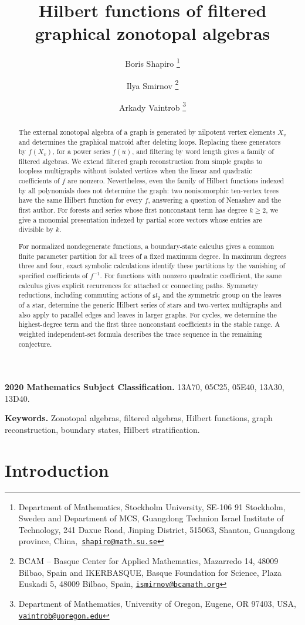 \documentclass[reqno]{article}
\title{\bf Hilbert functions of filtered graphical zonotopal algebras}
\author{Boris Shapiro%
 \thanks{Department of Mathematics, Stockholm University, SE-106 91 Stockholm,  Sweden and Department of MCS, Guangdong Technion Israel Institute of Technology,  241 Daxue Road, Jinping District, 515063, Shantou, Guangdong province, China,\
 \texttt{\href{mailto:shapiro@math.su.se}{shapiro@math.su.se}}}
\and
 Ilya Smirnov%
 \thanks{BCAM -- Basque Center for Applied Mathematics, Mazarredo 14, 48009 Bilbao, Spain \quad and \quad IKERBASQUE, Basque Foundation for Science, Plaza Euskadi 5, 48009 Bilbao, Spain,
 \texttt{\href{mailto:ismirnov@bcamath.org}{ismirnov@bcamath.org}}}
\and
 Arkady Vaintrob%
\thanks{Department of Mathematics, University of Oregon, Eugene, OR 97403, USA,
  \texttt{\href{mailto:vaintrob@uoregon.edu}{vaintrob@uoregon.edu}}}}
\date{}
\theoremstyle{plain} %
\theoremstyle{definition}
\theoremstyle{remark}
\numberwithin{equation}{section}
\begin{document}
\maketitle

\begin{abstract}
The external zonotopal algebra of a graph is generated by nilpotent
vertex elements $X_v$ and determines the graphical matroid after deleting
loops. Replacing these generators by $f(X_v)$, for a power series $f(u)$, and filtering by word
length gives a family of filtered algebras. We extend filtered graph
reconstruction from simple graphs to loopless multigraphs without
isolated vertices when the linear and quadratic coefficients of $f$ are
nonzero. Nevertheless, even the family of Hilbert functions indexed by
all polynomials does not determine the graph: two nonisomorphic
ten-vertex trees have the same Hilbert function for every $f$, answering
a question of Nenashev and the first author. For forests and series
whose first nonconstant term has degree $k\ge2$, we give a monomial
presentation indexed by partial score vectors whose entries are divisible
by $k$.

For normalized nondegenerate functions, a boundary-state calculus gives
a common finite parameter partition for all trees of a fixed maximum
degree. In maximum degrees three and four, exact symbolic calculations
identify these partitions by the vanishing of specified coefficients of $f^{-1}$. For functions
with nonzero quadratic coefficient, the same calculus gives explicit
recurrences for attached or connecting paths. Symmetry reductions,
including commuting actions of $\mathfrak{sl}_2$ and the symmetric group
on the leaves of a star, determine the generic Hilbert series of stars
and two-vertex multigraphs and also apply to parallel edges and leaves in larger graphs.
For cycles, we determine the highest-degree term and the first three
nonconstant coefficients in the stable range. A weighted independent-set
formula describes the trace sequence in the remaining conjecture.
\end{abstract}

\tableofcontents

\medskip

\noindent\textbf{2020 Mathematics Subject Classification.}
13A70, 05C25, 05E40, 13A30, 13D40.

\noindent\textbf{Keywords.} Zonotopal algebras, filtered algebras,
Hilbert functions, graph reconstruction, boundary states, Hilbert
stratification.

\section{Introduction}
\label{sec:introduction}
\end{document}
